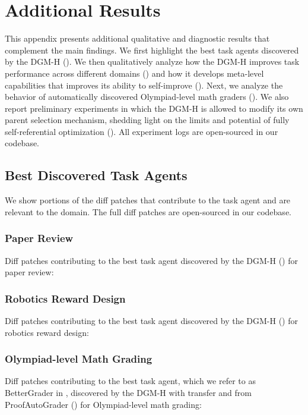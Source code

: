 \documentclass[]{fairmeta}
\begin{document}
\section{Additional Results}
\label{app:res}

This appendix presents additional qualitative and diagnostic results that complement the main findings. We first highlight the best task agents discovered by the DGM-H (). We then qualitatively analyze how the DGM-H improves task performance across different domains () and how it develops meta-level capabilities that improves its ability to self-improve (). Next, we analyze the behavior of automatically discovered Olympiad-level math graders (). We also report preliminary experiments in which the DGM-H is allowed to modify its own parent selection mechanism, shedding light on the limits and potential of fully self-referential optimization (). All experiment logs are open-sourced in our codebase.

\subsection{Best Discovered Task Agents}
\label{app:best-agents}

We show portions of the diff patches that contribute to the task agent and are relevant to the domain. The full diff patches are open-sourced in our codebase.

\subsubsection{Paper Review}
\label{app:best-agents-paperreview}
Diff patches contributing to the best task agent discovered by the DGM-H () for paper review:


\subsubsection{Robotics Reward Design}
\label{app:best-agents-genesis}
Diff patches contributing to the best task agent discovered by the DGM-H () for robotics reward design:


\subsubsection{Olympiad-level Math Grading}
\label{app:best-agents-imograding}
Diff patches contributing to the best task agent, which we refer to as BetterGrader in , discovered by the DGM-H with transfer and from ProofAutoGrader () for Olympiad-level math grading:

\end{document}
